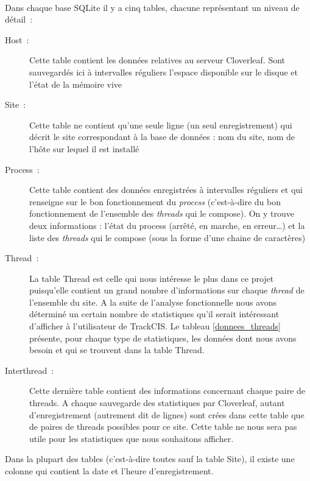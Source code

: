 			\paragraph{}
			Dans chaque base SQLite il y a cinq tables, chacune représentant
			un niveau de détail~:
			\begin{description}
			  \item[Host~:] Cette table contient les données relatives au serveur
			  Cloverleaf. Sont sauvegardés ici à intervalles réguliers l'espace
			  disponible sur le disque et l'état de la mémoire vive
			  \item[Site~:] Cette table ne contient qu'une seule ligne (un seul
			  enregistrement) qui décrit le site correspondant à la base de données : nom
			  du site, nom de l'hôte sur lequel il est installé
			  \item[Process~:] Cette table contient des données enregistrées à
			  intervalles réguliers et qui renseigne sur le bon fonctionnement du
			  \textit{process} (c'est-à-dire du bon fonctionnement de l'ensemble des
			  \textit{threads} qui le compose). On y trouve deux informations : l'état du
			  process (arrêté, en marche, en erreur\ldots) et la liste des
			  \textit{threads} qui le compose (sous la forme d'une chaine de caractères)
			  \item[Thread~:] La table Thread est celle qui nous intéresse le plus dans
			  ce projet puisqu'elle contient un grand nombre d'informations sur chaque
			  \textit{thread} de l'ensemble du site. A la suite de l'analyse
			  fonctionnelle nous avons déterminé un certain nombre de statistiques qu'il serait intéressant
			  d'afficher à l'utilisateur de TrackCIS. Le tableau \ref{donnees_threads}
			  présente, pour chaque type de statistiques, les données dont nous avons
			  besoin et qui se trouvent dans la table Thread.
			  \item[Interthread~:] Cette dernière table contient des informations
			  concernant chaque paire de threads. A chaque sauvegarde des statistiques
			  par Cloverleaf, autant d'enregistrement (autrement dit de lignes) sont crées
			  dans cette table que de paires de threads possibles pour ce site. Cette
			  table ne nous sera pas utile pour les statistiques que nous souhaitons
			  afficher.
			\end{description}
			Dans la plupart des tables (c'est-à-dire toutes sauf la table Site), il
			existe une colonne qui contient la date et l'heure d'enregistrement.
